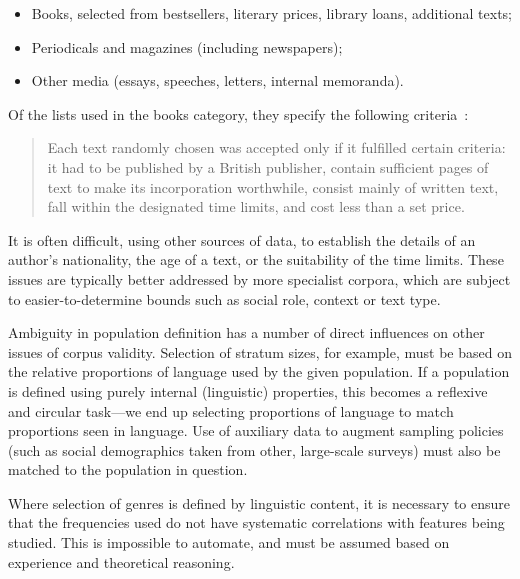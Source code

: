 \begin{itemize}
 \item Books, selected from bestsellers, literary prices, library loans, additional texts;
 \item Periodicals and magazines (including newspapers);
 \item Other media (essays, speeches, letters, internal memoranda).
\end{itemize}

Of the lists used in the books category, they specify the following criteria~\cite[p. 9]{burnard1995users}:

\begin{quote}
Each text randomly chosen was accepted only if it fulfilled certain criteria: it had to be published by a British publisher, contain sufficient pages of text to make its incorporation worthwhile, consist mainly of written text, fall within the designated time limits, and cost less than a set price.
\end{quote}

It is often difficult, using other sources of data, to establish the details of an author's nationality, the age of a text, or the suitability of the time limits\cite{dollinger2006oh}.
These issues are typically better addressed by more specialist corpora, which are subject to easier-to-determine bounds such as social role, context or text type\cite{kucera2002czech,przepiorkowski2008towards,kyto1993manual}.

Ambiguity in population definition has a number of direct influences on other issues of corpus validity. Selection of stratum sizes, for example, must be based on the relative proportions of language used by the given population.  If a population is defined using purely internal (linguistic) properties, this becomes a reflexive and circular task---we end up selecting proportions of language to match proportions seen in language.  Use of auxiliary data to augment sampling policies (such as social demographics taken from other, large-scale surveys) must also be matched to the population in question.

Where selection of genres is defined by linguistic content, it is necessary to ensure that the frequencies used do not have systematic correlations with features being studied.  This is impossible to automate, and must be assumed based on experience and theoretical reasoning.

